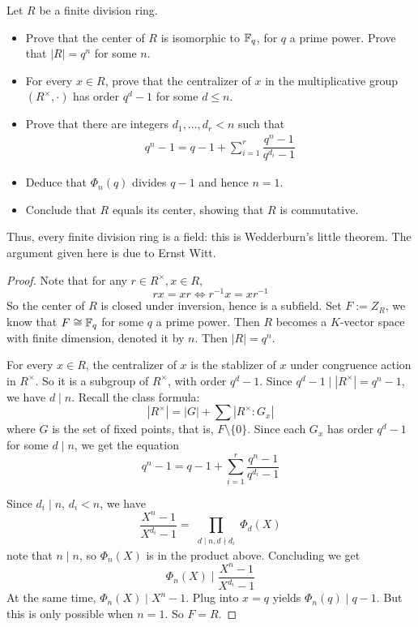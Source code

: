 \begin{exercise}
Let $R$ be a finite division ring.
\begin{itemize}
\item Prove that the center of $R$ is isomorphic to $\mathbb{F}_q$, for $q$ a prime power. Prove that $|R|=q^n$ for some $n$.
\item For every $x\in R$, prove that the centralizer of $x$ in the multiplicative group $(R^{\times},\cdot)$ has order $q^d-1$ for some $d\leq n$.
\item Prove that there are integers $d_1,\dots,d_r<n$ such that
\begin{align*}
q^n-1=q-1+\sum_{i=1}^{r}\dfrac{q^n-1}{q^{d_i}-1}
\end{align*}
\item Deduce that $\Phi_n(q)$ divides $q-1$ and hence $n=1$.
\item Conclude that $R$ equals its center, showing that $R$ is commutative.
\end{itemize}
Thus, every finite division ring is a field: this is Wedderburn's little theorem. The argument given here is due to Ernst Witt.
\end{exercise}
\begin{proof}
Note that for any $r\in R^{\times}, x\in R$,
\[rx=xr\Leftrightarrow r^{-1}x=xr^{-1}\]
So the center of $R$ is closed under inversion, hence is a subfield. Set $F:=Z_R$, we know that $F\cong\mathbb{F}_q$ for some $q$ a prime power. Then $R$ becomes a $K$-vector space with finite dimension, denoted it by $n$. Then $|R|=q^n$.\par
For every $x\in R$, the centralizer of $x$ is the stablizer of $x$ under congruence action in $R^{\times}$. So it is a subgroup of $R^{\times}$, with order $q^d-1$. Since $q^d-1\mid|R^{\times}|=q^n-1$, we have $d\mid n$. Recall the class formula:
\[|R^{\times}|=|G|+\sum|R^{\times}:G_x|\]
where $G$ is the set of fixed points, that is, $F\setminus\{0\}$. Since each $G_x$ has order $q^d-1$ for some $d\mid n$, we get the equation
\[q^n-1=q-1+\sum_{i=1}^{r}\dfrac{q^n-1}{q^{d_i}-1}\]
\item Since $d_i\mid n$, $d_i<n$, we have
\[\dfrac{X^n-1}{X^{d_i}-1}=\prod_{\substack{d\mid n,d\nmid d_i}}\Phi_{d}(X)\]
note that $n\mid n$, so $\Phi_n(X)$ is in the product above. Concluding we get
\[\Phi_n(X)\mid \dfrac{X^n-1}{X^{d_i}-1}\]
At the same time, $\Phi_n(X)\mid X^n-1$. Plug into $x=q$ yields $\Phi_n(q)\mid q-1$. But this is only possible when $n=1$. So $F=R$.
\end{proof}

